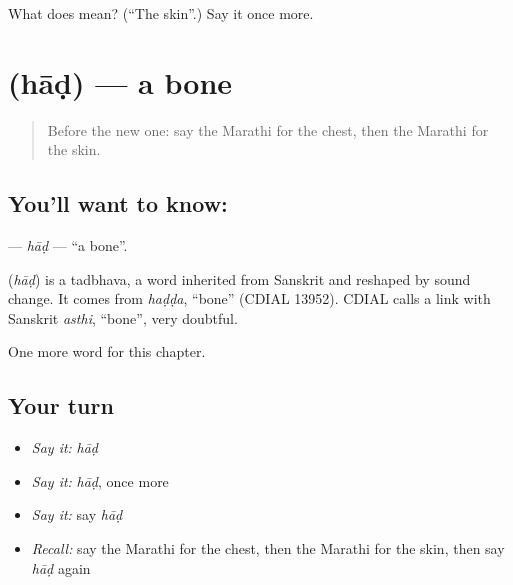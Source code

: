 \begin{tcolorbox}[breakable,colback=teal!4,colframe=teal!35!black,title={Before you move on}]
What does  mean? (\textquotedblleft{}The skin\textquotedblright{}.) Say it once more.
\end{tcolorbox}
\section[\texorpdfstring{\mr{हाड} (hāḍ)}{हाड (hāḍ)}]{ (hāḍ) — a bone}

\label{lesson:MR-C147-had}



\begin{quote}
Before the new one: say the Marathi for the chest, then the Marathi for the skin.
\end{quote}

\subsection*{You'll want to know: }
\textbf{} — \emph{hāḍ} — \textquotedblleft{}a bone\textquotedblright{}.

\begin{cousinweb}
\textbf{} (\emph{hāḍ}) is a tadbhava, a word inherited from Sanskrit and reshaped by sound change. It comes from \emph{haḍḍa}, \textquotedblleft{}bone\textquotedblright{} (CDIAL 13952). CDIAL calls a link with Sanskrit \emph{asthi}, \textquotedblleft{}bone\textquotedblright{}, very doubtful.
\end{cousinweb}

\begin{grammarlens}[title={What you've built}]
One more word for this chapter.
\end{grammarlens}

\subsection*{Your turn}
\begin{itemize}
\raggedright
  \item \emph{Say it:} \emph{hāḍ}
  \item \emph{Say it:} \emph{hāḍ}, once more
  \item \emph{Say it:} say \emph{hāḍ}
  \item \emph{Recall:} say the Marathi for the chest, then the Marathi for the skin, then say \emph{hāḍ} again
\end{itemize}

